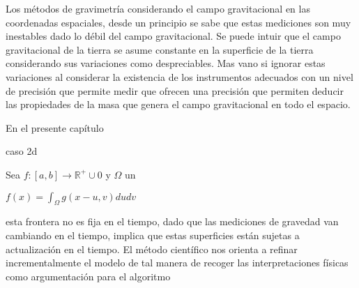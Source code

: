 

Los métodos de gravimetría considerando el campo gravitacional en las
coordenadas espaciales, desde un principio se sabe que estas mediciones son muy
inestables dado lo débil del campo gravitacional. Se puede intuir que el campo
gravitacional de la tierra se asume constante en la superficie de la tierra
considerando sus variaciones como despreciables. Mas vano si ignorar estas
variaciones al considerar la existencia de los instrumentos adecuados con un
nivel de precisión que permite medir %
que ofrecen una precisión que permiten deducir las propiedades de la masa que
genera el campo gravitacional en todo el espacio.

En el presente capítulo 


caso 2d

Sea $f:[a,b]\to \mathbb{R}^+ \cup 0$ y $\Omega$ un %

$f(x) = \int_\Omega g(x-u,v)dudv$

esta frontera no es fija en el tiempo, dado que las mediciones de gravedad van
cambiando en el tiempo, implica que estas superficies están sujetas a
actualización en el tiempo. El método científico nos orienta a refinar
incrementalmente el modelo de tal manera de recoger las interpretaciones físicas
como argumentación para el algoritmo



